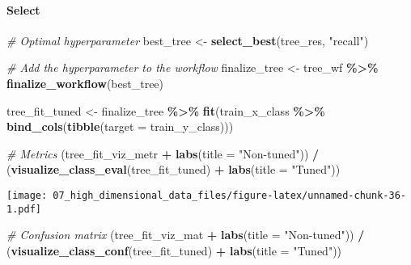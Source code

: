 \documentclass[
]{book}
\newenvironment{Shaded}{\begin{snugshade}}{\end{snugshade}}
\newcommand{\CommentTok}[1]{\textcolor[rgb]{0.56,0.35,0.01}{\textit{#1}}}
\newcommand{\DataTypeTok}[1]{\textcolor[rgb]{0.13,0.29,0.53}{#1}}
\newcommand{\KeywordTok}[1]{\textcolor[rgb]{0.13,0.29,0.53}{\textbf{#1}}}
\newcommand{\NormalTok}[1]{#1}
\newcommand{\OperatorTok}[1]{\textcolor[rgb]{0.81,0.36,0.00}{\textbf{#1}}}
\newcommand{\StringTok}[1]{\textcolor[rgb]{0.31,0.60,0.02}{#1}}
\begin{document}
\hypertarget{select-1}{%
\paragraph{Select}\label{select-1}}

\begin{Shaded}
\begin{Highlighting}[]
\CommentTok{\# Optimal hyperparameter}
\NormalTok{best\_tree \textless{}{-}}\StringTok{ }\KeywordTok{select\_best}\NormalTok{(tree\_res, }\StringTok{"recall"}\NormalTok{)}

\CommentTok{\# Add the hyperparameter to the workflow}
\NormalTok{finalize\_tree \textless{}{-}}\StringTok{ }\NormalTok{tree\_wf }\OperatorTok{\%\textgreater{}\%}
\StringTok{  }\KeywordTok{finalize\_workflow}\NormalTok{(best\_tree)}
\end{Highlighting}
\end{Shaded}

\begin{Shaded}
\begin{Highlighting}[]
\NormalTok{tree\_fit\_tuned \textless{}{-}}\StringTok{ }\NormalTok{finalize\_tree }\OperatorTok{\%\textgreater{}\%}
\StringTok{  }\KeywordTok{fit}\NormalTok{(train\_x\_class }\OperatorTok{\%\textgreater{}\%}\StringTok{ }\KeywordTok{bind\_cols}\NormalTok{(}\KeywordTok{tibble}\NormalTok{(}\DataTypeTok{target =}\NormalTok{ train\_y\_class)))}

\CommentTok{\# Metrics}
\NormalTok{(tree\_fit\_viz\_metr }\OperatorTok{+}\StringTok{ }\KeywordTok{labs}\NormalTok{(}\DataTypeTok{title =} \StringTok{"Non{-}tuned"}\NormalTok{)) }\OperatorTok{/}\StringTok{ }\NormalTok{(}\KeywordTok{visualize\_class\_eval}\NormalTok{(tree\_fit\_tuned) }\OperatorTok{+}\StringTok{ }\KeywordTok{labs}\NormalTok{(}\DataTypeTok{title =} \StringTok{"Tuned"}\NormalTok{))}
\end{Highlighting}
\end{Shaded}

\texttt{[image: 07\_high\_dimensional\_data\_files/figure-latex/unnamed-chunk-36-1.pdf]}

\begin{Shaded}
\begin{Highlighting}[]
\CommentTok{\# Confusion matrix}
\NormalTok{(tree\_fit\_viz\_mat }\OperatorTok{+}\StringTok{ }\KeywordTok{labs}\NormalTok{(}\DataTypeTok{title =} \StringTok{"Non{-}tuned"}\NormalTok{)) }\OperatorTok{/}\StringTok{ }\NormalTok{(}\KeywordTok{visualize\_class\_conf}\NormalTok{(tree\_fit\_tuned) }\OperatorTok{+}\StringTok{ }\KeywordTok{labs}\NormalTok{(}\DataTypeTok{title =} \StringTok{"Tuned"}\NormalTok{))}
\end{Highlighting}
\end{Shaded}
\end{document}
